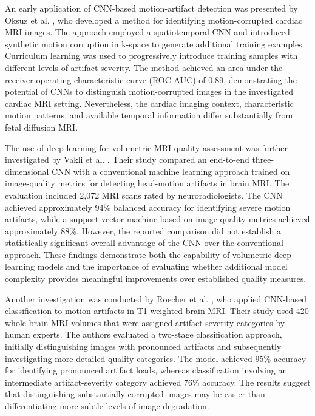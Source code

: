 An early application of CNN-based motion-artifact detection was presented by Oksuz et al. \autocite{oksuz2019cardiac}, who developed a method for identifying motion-corrupted cardiac MRI images. The approach employed a spatiotemporal CNN and introduced synthetic motion corruption in k-space to generate additional training examples. Curriculum learning was used to progressively introduce training samples with different levels of artifact severity. The method achieved an area under the receiver operating characteristic curve (ROC-AUC) of 0.89, demonstrating the potential of CNNs to distinguish motion-corrupted images in the investigated cardiac MRI setting. Nevertheless, the cardiac imaging context, characteristic motion patterns, and available temporal information differ substantially from fetal diffusion MRI.

The use of deep learning for volumetric MRI quality assessment was further investigated by Vakli et al. \autocite{vakli2023motion}. Their study compared an end-to-end three-dimensional CNN with a conventional machine learning approach trained on image-quality metrics for detecting head-motion artifacts in brain MRI. The evaluation included 2,072 MRI scans rated by neuroradiologists. The CNN achieved approximately 94\% balanced accuracy for identifying severe motion artifacts, while a support vector machine based on image-quality metrics achieved approximately 88\%. However, the reported comparison did not establish a statistically significant overall advantage of the CNN over the conventional approach. These findings demonstrate both the capability of volumetric deep learning models and the importance of evaluating whether additional model complexity provides meaningful improvements over established quality measures.

Another investigation was conducted by Roecher et al. \autocite{roecher2024motion}, who applied CNN-based classification to motion artifacts in T1-weighted brain MRI. Their study used 420 whole-brain MRI volumes that were assigned artifact-severity categories by human experts. The authors evaluated a two-stage classification approach, initially distinguishing images with pronounced artifacts and subsequently investigating more detailed quality categories. The model achieved 95\% accuracy for identifying pronounced artifact loads, whereas classification involving an intermediate artifact-severity category achieved 76\% accuracy. The results suggest that distinguishing substantially corrupted images may be easier than differentiating more subtle levels of image degradation.

